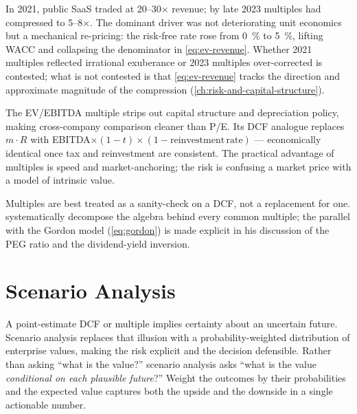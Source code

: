 In 2021, public SaaS traded at 20--30$\times$ revenue; by late 2023 multiples had
compressed to 5--8$\times$. The dominant driver was not deteriorating unit economics but a
mechanical re-pricing: the risk-free rate rose from \qty{0}{\percent} to \qty{5}{\percent},
lifting WACC and collapsing the denominator in \cref{eq:ev-revenue}. Whether 2021 multiples
reflected irrational exuberance or 2023 multiples over-corrected is contested; what is not
contested is that \cref{eq:ev-revenue} tracks the direction and approximate magnitude of the
compression (\cref{ch:risk-and-capital-structure}).

The EV/EBITDA multiple strips out capital structure and depreciation policy, making
cross-company comparison cleaner than P/E. Its DCF analogue replaces \(m\cdot R\) with
EBITDA\(\times(1-t)\times(1-\mathrm{reinvestment\,rate})\) --- economically identical once
tax and reinvestment are consistent. The practical advantage of multiples is speed and
market-anchoring; the risk is confusing a market price with a model of intrinsic value.

Multiples are best treated as a sanity-check on a DCF, not a replacement for one.
\textcite{damodaran2012} systematically decompose the algebra behind every common
multiple; the parallel with the Gordon model (\cref{eq:gordon}) is made explicit
in his discussion of the PEG ratio and the dividend-yield inversion.

\section{Scenario Analysis}\label{sec:scenario-analysis}

A point-estimate DCF or multiple implies certainty about an uncertain future. Scenario
analysis replaces that illusion with a probability-weighted distribution of enterprise
values, making the risk explicit and the decision defensible. Rather than asking ``what is
the value?'' scenario analysis asks ``what is the value \emph{conditional on each plausible
future}?'' Weight the outcomes by their probabilities and the expected value captures both
the upside and the downside in a single actionable number.

